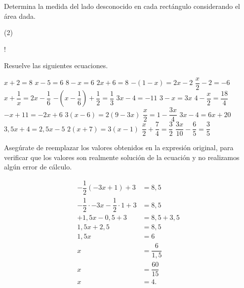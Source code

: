 \documentclass[options]{plantilla-material-v1}
\begin{document}
Determina la medida del lado desconocido en cada rectángulo considerando el área dada.
\begin{ejercicios}[resume](2)
  \ejercicio 
  \ejercicio 
  \ejercicio!

\end{ejercicios}

Resuelve las siguientes ecuaciones.
\begin{ejercicios}
  \ejercicio $x+2=8$
  \ejercicio $x-5=6$
  \ejercicio $8-x=6$
  \ejercicio $2x+6=8$
  \ejercicio $-(1-x)=2x-2$
  \ejercicio $\dfrac{x}{2}-2=-6$
  \ejercicio $x+\dfrac{1}{x}=2x-\dfrac{1}{6}$
  \ejercicio $-\left(x-\dfrac{1}{6}\right)+\dfrac{1}{2}=\dfrac{1}{3}$
  \ejercicio $3x-4=-11$
  \ejercicio $3-x=3x$
  \ejercicio $4-\dfrac{x}{2}=\dfrac{18}{4}$
  \ejercicio $-x+11=-2x+6$
  \ejercicio $3(x-6)=2(9-3x)$
  \ejercicio $\dfrac{x}{2}=1-\dfrac{3x}{4}$
  \ejercicio $3x-4=6x+20$
  \ejercicio $3,5x+4=2,5x-5$
  \ejercicio $2(x+7)=3(x-1)$
  \ejercicio $\dfrac{x}{2}+\dfrac{7}{4}=\dfrac{3}{2}$
  \ejercicio $\dfrac{3x}{10}-\dfrac{6}{5}=\dfrac{3}{5}$
\end{ejercicios}

Asegúrate de reemplazar los valores obtenidos en la expresión original, para 
verificar que los valores son realmente solución de la ecuación y no realizamos
algún error de cálculo.

\begin{equation*}
  \begin{split}
    -\dfrac{1}{2}(-3x+1) +3 &= 8,5 \\
     -\dfrac{1}{2}\cdot-3x -\dfrac{1}{2}\cdot1 +3 &= 8,5 \\
     +1,5x-0,5+3 &= 8,5 +3,5 \\
     1,5x + 2,5 &= 8,5 \\
     1,5x &= 6 \\
     x &= \dfrac{6}{1,5} \\
     x &= \dfrac{60}{15} \\
     x &= 4.
  \end{split}
\end{equation*}
\end{document}
